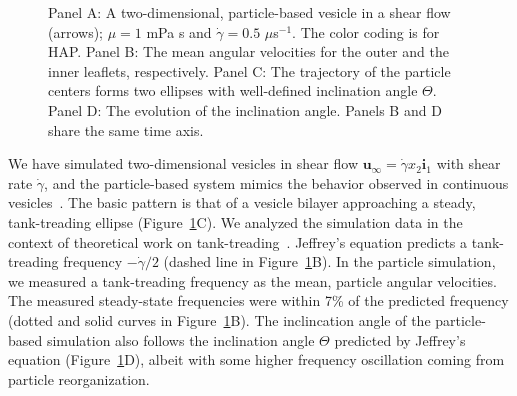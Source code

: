 \begin{figure}
\vspace{-5pt}
  \vspace{-25pt}
  \caption{\label{fig:tank_treading} \footnotesize
    Panel A: A two-dimensional,
    particle-based vesicle in a shear flow (arrows); $\mu  = 1$ mPa s and
    $\dot{\gamma} = 0.5$ $\mu$s$^{-1}$. The color coding is for HAP. Panel B: The
    mean angular velocities for the outer and the inner leaflets, 
    respectively. Panel C: The trajectory of the particle
    centers forms two ellipses with well-defined inclination angle
    $\Theta$. Panel D: The evolution of the inclination angle.
    Panels B and D share the same time axis.}
\end{figure}

We have simulated two-dimensional vesicles in shear flow
$\mathbf{u}_{\infty} = \dot{\gamma} x_2 \mathbf{i}_1$ with shear rate
$\dot{\gamma}$,
and the particle-based system mimics the behavior observed in continuous
vesicles~\cite{torres-sanchez_millan_arroyo_2019,
mahapatra_saintillan_rangamani_2020, Steigmann99, C6SM02452A}. The basic
pattern is that of a vesicle bilayer approaching a steady, tank-treading
ellipse (Figure~\ref{fig:tank_treading}C). We analyzed the simulation
data in the context of theoretical work on
tank-treading~\cite{Finken2008, PhysRevLett.106.158103}.
Jeffrey's equation predicts a tank-treading frequency $-\dot{\gamma}/2$ (dashed line in
Figure~\ref{fig:tank_treading}B). In the particle simulation, we measured
a tank-treading frequency as the mean, particle angular
velocities. The measured steady-state frequencies were within 7\% of the predicted 
frequency (dotted and solid curves in Figure~\ref{fig:tank_treading}B).
The inclincation angle of the particle-based simulation also
follows the inclination angle $\Theta$ predicted by Jeffrey's
equation (Figure~\ref{fig:tank_treading}D), albeit with some higher frequency oscillation
coming from particle reorganization.

